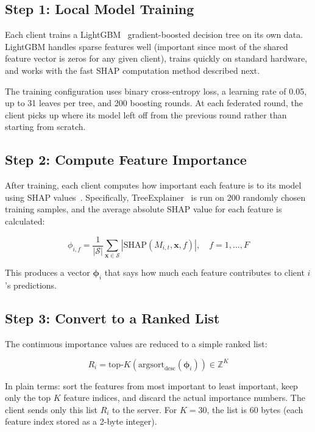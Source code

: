 \documentclass[12pt,a4paper]{article}
\begin{document}
\subsection{Step 1: Local Model Training}

Each client trains a LightGBM~\cite{ke2017lightgbm} gradient-boosted decision tree on its own data. LightGBM handles sparse features well (important since most of the shared feature vector is zeros for any given client), trains quickly on standard hardware, and works with the fast SHAP computation method described next.

The training configuration uses binary cross-entropy loss, a learning rate of 0.05, up to 31 leaves per tree, and 200 boosting rounds. At each federated round, the client picks up where its model left off from the previous round rather than starting from scratch.

\subsection{Step 2: Compute Feature Importance}

After training, each client computes how important each feature is to its model using SHAP values~\cite{lundberg2017shap}. Specifically, TreeExplainer~\cite{lundberg2020treeshap} is run on 200 randomly chosen training samples, and the average absolute SHAP value for each feature is calculated:

\begin{equation}\label{eq:shap}
  \phi_{i,f} = \frac{1}{|\mathcal{S}|} \sum_{\mathbf{x} \in \mathcal{S}} \left| \text{SHAP}(M_{i,t}, \mathbf{x}, f) \right|, \quad f = 1, \ldots, F
\end{equation}

This produces a vector $\boldsymbol{\phi}_i$ that says how much each feature contributes to client $i$'s predictions.

\subsection{Step 3: Convert to a Ranked List}

The continuous importance values are reduced to a simple ranked list:

\begin{equation}\label{eq:rank}
  R_i = \text{top-}K\left(\text{argsort}_{\text{desc}}(\boldsymbol{\phi}_i)\right) \in \mathbb{Z}^K
\end{equation}

In plain terms: sort the features from most important to least important, keep only the top $K$ feature indices, and discard the actual importance numbers. The client sends only this list $R_i$ to the server. For $K = 30$, the list is 60 bytes (each feature index stored as a 2-byte integer).
\end{document}
